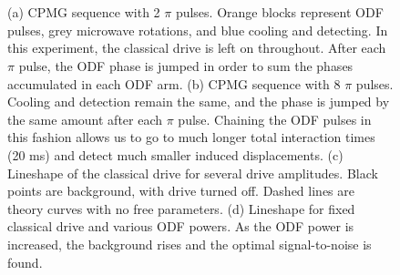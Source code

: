\documentclass[aps,prl,twocolumn,groupedaddress]{revtex4-1}
\begin{document}
\begin{figure}
  \\
  \\
  \hfill
  \caption{(a) CPMG sequence with 2 $\pi$ pulses. Orange blocks represent ODF pulses, grey microwave rotations, and blue cooling and detecting. In this experiment, the classical drive is left on throughout. After each $\pi$ pulse, the ODF phase is jumped in order to sum the phases accumulated in each ODF arm. (b) CPMG sequence with 8 $\pi$ pulses. Cooling and detection remain the same, and the phase is jumped by the same amount after each $\pi$ pulse. Chaining the ODF pulses in this fashion allows us to go to much longer total interaction times (20 ms) and detect much smaller induced displacements.   (c) Lineshape of the classical drive for several drive amplitudes. Black points are background, with drive turned off. Dashed lines are theory curves with no free parameters.  (d) Lineshape for fixed classical drive and various ODF powers. As the ODF power is increased, the background rises and the optimal signal-to-noise is found.}\label{fig:2}
\end{figure}
\end{document}
